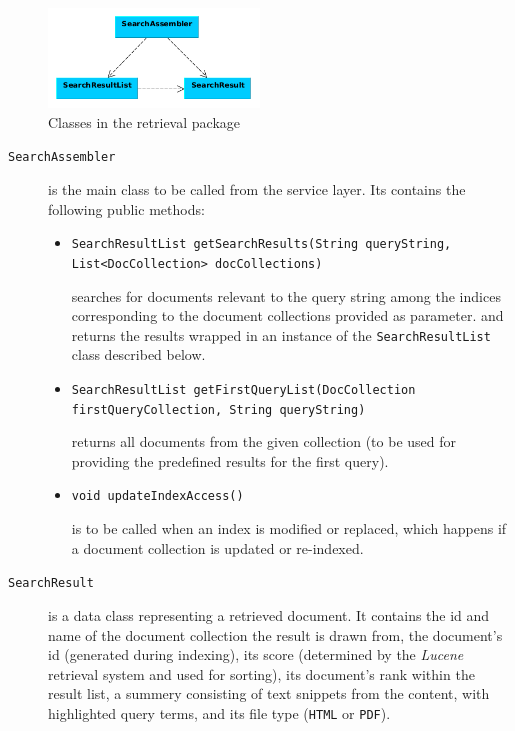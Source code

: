 \documentclass[a4paper]{usiinfbachelorproject}
\begin{document}
\begin{figure}[h!]
\centering
\includegraphics[width=0.5\textwidth]{figures/retrievalClasses}
\caption{Classes in the retrieval package}
\label{fig:retrievalClasses}
\end{figure}


\begin{description}

    \item[\texttt{SearchAssembler}] is the main class to be called from the service layer. Its contains the following public methods:

        \begin{itemize}

            \item \texttt{SearchResultList getSearchResults(String queryString, List<DocCollection> docCollections)}

                searches for documents relevant to the query string among the indices corresponding to the document collections
                provided as parameter.
                and returns the results wrapped in an instance of the \texttt{SearchResultList} class described below.

            \item \texttt{SearchResultList getFirstQueryList(DocCollection firstQueryCollection, String queryString)}

                returns all documents from the given collection (to be used for providing the predefined results for 
                the first query).

            \item \texttt{void updateIndexAccess()}

                is to be called when an index is modified or replaced, which happens if a document collection is updated 
                or re-indexed.

        \end{itemize}

    \item[\texttt{SearchResult}] is a data class representing a retrieved document. It contains the id and name
            of the document collection the result is drawn from, the document's id (generated during indexing),
            its score (determined by the \emph{Lucene} retrieval system and used for sorting), its document's
            rank within the result list, a summery consisting of text snippets from the content, with highlighted
            query terms, and its file type (\texttt{HTML} or \texttt{PDF}).


\end{description}
\end{document}
